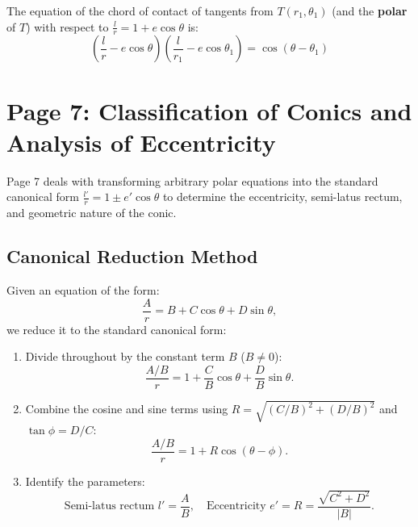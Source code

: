 \begin{theorembox}
The equation of the chord of contact of tangents from $T(r_1, \theta_1)$ (and the \textbf{polar} of $T$) with respect to $\frac{l}{r} = 1 + e\cos\theta$ is:
\begin{equation}
    \boxed{\left(\frac{l}{r} - e\cos\theta\right)\left(\frac{l}{r_1} - e\cos\theta_1\right) = \cos(\theta - \theta_1)}
\end{equation}
\end{theorembox}

\newpage
\section{Page 7: Classification of Conics and Analysis of Eccentricity}
\label{sec:page07}

\begin{conceptbox}
Page 7 deals with transforming arbitrary polar equations into the standard canonical form $\frac{l'}{r} = 1 \pm e'\cos\theta$ to determine the eccentricity, semi-latus rectum, and geometric nature of the conic.
\end{conceptbox}

\subsection{Canonical Reduction Method}
Given an equation of the form:
\begin{equation}
    \frac{A}{r} = B + C\cos\theta + D\sin\theta,
\end{equation}
we reduce it to the standard canonical form:
\begin{enumerate}
    \item Divide throughout by the constant term $B$ ($B \neq 0$):
    \begin{equation}
        \frac{A/B}{r} = 1 + \frac{C}{B}\cos\theta + \frac{D}{B}\sin\theta.
    \end{equation}
    \item Combine the cosine and sine terms using $R = \sqrt{(C/B)^2 + (D/B)^2}$ and $\tan\phi = D/C$:
    \begin{equation}
        \frac{A/B}{r} = 1 + R\cos(\theta - \phi).
    \end{equation}
    \item Identify the parameters:
    \begin{equation}
        \text{Semi-latus rectum } l' = \frac{A}{B}, \quad \text{Eccentricity } e' = R = \frac{\sqrt{C^2 + D^2}}{|B|}.
    \end{equation}
\end{enumerate}

